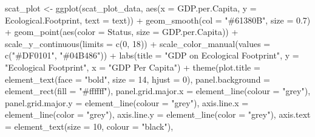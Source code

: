 \documentclass[
]{article}
\newenvironment{Shaded}{\begin{snugshade}}{\end{snugshade}}
\newcommand{\AttributeTok}[1]{\textcolor[rgb]{0.77,0.63,0.00}{#1}}
\newcommand{\DecValTok}[1]{\textcolor[rgb]{0.00,0.00,0.81}{#1}}
\newcommand{\FloatTok}[1]{\textcolor[rgb]{0.00,0.00,0.81}{#1}}
\newcommand{\FunctionTok}[1]{\textcolor[rgb]{0.00,0.00,0.00}{#1}}
\newcommand{\NormalTok}[1]{#1}
\newcommand{\OtherTok}[1]{\textcolor[rgb]{0.56,0.35,0.01}{#1}}
\newcommand{\SpecialCharTok}[1]{\textcolor[rgb]{0.00,0.00,0.00}{#1}}
\newcommand{\StringTok}[1]{\textcolor[rgb]{0.31,0.60,0.02}{#1}}
\begin{document}
\begin{Shaded}
\begin{Highlighting}[]
\NormalTok{scat\_plot }\OtherTok{\textless{}{-}} \FunctionTok{ggplot}\NormalTok{(scat\_plot\_data, }\FunctionTok{aes}\NormalTok{(}\AttributeTok{x =}\NormalTok{ GDP.per.Capita,}
                                        \AttributeTok{y =}\NormalTok{ Ecological.Footprint, }\AttributeTok{text =}\NormalTok{ text)) }\SpecialCharTok{+} \FunctionTok{geom\_smooth}\NormalTok{(}\AttributeTok{col =} \StringTok{"\#61380B"}\NormalTok{,}
                                                                                              \AttributeTok{size =} \FloatTok{0.7}\NormalTok{) }\SpecialCharTok{+} \FunctionTok{geom\_point}\NormalTok{(}\FunctionTok{aes}\NormalTok{(}\AttributeTok{color =}\NormalTok{ Status, }\AttributeTok{size =}\NormalTok{ GDP.per.Capita)) }\SpecialCharTok{+}
  \FunctionTok{scale\_y\_continuous}\NormalTok{(}\AttributeTok{limits =} \FunctionTok{c}\NormalTok{(}\DecValTok{0}\NormalTok{, }\DecValTok{18}\NormalTok{)) }\SpecialCharTok{+} \FunctionTok{scale\_color\_manual}\NormalTok{(}\AttributeTok{values =} \FunctionTok{c}\NormalTok{(}\StringTok{"\#DF0101"}\NormalTok{,}
                                                                        \StringTok{"\#04B486"}\NormalTok{)) }\SpecialCharTok{+} \FunctionTok{labs}\NormalTok{(}\AttributeTok{title =} \StringTok{"GDP on Ecological Footprint"}\NormalTok{,}
                                                                                           \AttributeTok{y =} \StringTok{"Ecological Footprint"}\NormalTok{, }\AttributeTok{x =} \StringTok{"GDP Per Capita"}\NormalTok{) }\SpecialCharTok{+}
  \FunctionTok{theme}\NormalTok{(}\AttributeTok{plot.title =} \FunctionTok{element\_text}\NormalTok{(}\AttributeTok{face =} \StringTok{"bold"}\NormalTok{,}
                                  \AttributeTok{size =} \DecValTok{14}\NormalTok{, }\AttributeTok{hjust =} \DecValTok{0}\NormalTok{), }\AttributeTok{panel.background =} \FunctionTok{element\_rect}\NormalTok{(}\AttributeTok{fill =} \StringTok{"\#ffffff"}\NormalTok{),}
        \AttributeTok{panel.grid.major.x =} \FunctionTok{element\_line}\NormalTok{(}\AttributeTok{colour =} \StringTok{"grey"}\NormalTok{),}
        \AttributeTok{panel.grid.major.y =} \FunctionTok{element\_line}\NormalTok{(}\AttributeTok{colour =} \StringTok{"grey"}\NormalTok{),}
        \AttributeTok{axis.line.x =} \FunctionTok{element\_line}\NormalTok{(}\AttributeTok{color =} \StringTok{"grey"}\NormalTok{),}
        \AttributeTok{axis.line.y =} \FunctionTok{element\_line}\NormalTok{(}\AttributeTok{color =} \StringTok{"grey"}\NormalTok{),}
        \AttributeTok{axis.text =} \FunctionTok{element\_text}\NormalTok{(}\AttributeTok{size =} \DecValTok{10}\NormalTok{, }\AttributeTok{colour =} \StringTok{"black"}\NormalTok{),}

\end{Highlighting}
\end{Shaded}
\end{document}
